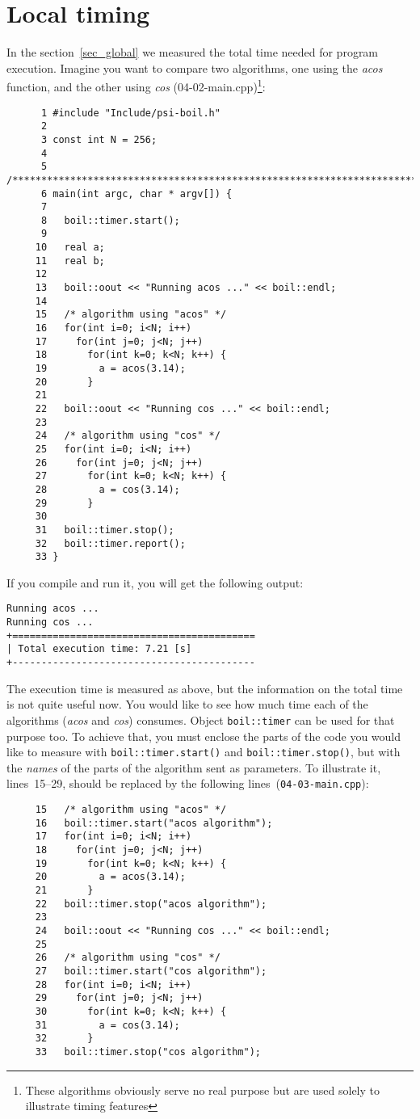 \section{Local timing}
\label{sec_local}

In the section~\ref{sec_global} we measured the total time needed
for program execution. Imagine you want to compare two algorithms,
one using the {\em acos} function, and the other using {\em cos}
(04-02-main.cpp)\footnote{These algorithms obviously serve no real 
purpose but are used solely to illustrate timing features}:
%
{\small \begin{verbatim}
      1 #include "Include/psi-boil.h"
      2
      3 const int N = 256;
      4
      5 /****************************************************************************/
      6 main(int argc, char * argv[]) {
      7
      8   boil::timer.start();
      9
     10   real a;
     11   real b;
     12
     13   boil::oout << "Running acos ..." << boil::endl;
     14
     15   /* algorithm using "acos" */
     16   for(int i=0; i<N; i++)
     17     for(int j=0; j<N; j++)
     18       for(int k=0; k<N; k++) {
     19         a = acos(3.14);
     20       }
     21
     22   boil::oout << "Running cos ..." << boil::endl;
     23
     24   /* algorithm using "cos" */
     25   for(int i=0; i<N; i++)
     26     for(int j=0; j<N; j++)
     27       for(int k=0; k<N; k++) {
     28         a = cos(3.14);
     29       }
     30
     31   boil::timer.stop();
     32   boil::timer.report();
     33 }
\end{verbatim}}
%
If you compile and run it, you will get the following output:
%
{\small \begin{verbatim}
Running acos ...
Running cos ...
+==========================================
| Total execution time: 7.21 [s]
+------------------------------------------
\end{verbatim}}
%
The execution time is measured as above, but the information on the 
total time is not quite useful now. You would like to see how much
time each of the algorithms ({\em acos} and {\em cos}) consumes.
Object {\tt boil::timer} can be used for that purpose too. To achieve
that, you must enclose the parts of the code you would like to 
measure with {\tt boil::timer.start()} and {\tt boil::timer.stop()},
but with the {\em names} of the parts of the algorithm sent as
parameters. To illustrate it, lines~15--29, should be replaced by the 
following lines~({\tt 04-03-main.cpp}):
%
{\small \begin{verbatim}
     15   /* algorithm using "acos" */
     16   boil::timer.start("acos algorithm");
     17   for(int i=0; i<N; i++)
     18     for(int j=0; j<N; j++)
     19       for(int k=0; k<N; k++) {
     20         a = acos(3.14);
     21       }
     22   boil::timer.stop("acos algorithm");
     23
     24   boil::oout << "Running cos ..." << boil::endl;
     25
     26   /* algorithm using "cos" */
     27   boil::timer.start("cos algorithm");
     28   for(int i=0; i<N; i++)
     29     for(int j=0; j<N; j++)
     30       for(int k=0; k<N; k++) {
     31         a = cos(3.14);
     32       }
     33   boil::timer.stop("cos algorithm");
\end{verbatim}}
